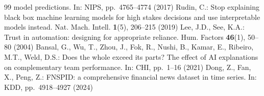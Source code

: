 \documentclass[runningheads]{llncs}
\begin{document}
\begin{thebibliography}{99}
model predictions. In: NIPS, pp.\ 4765--4774 (2017)
 Rudin, C.: Stop explaining black box machine learning models for
high stakes decisions and use interpretable models instead. Nat. Mach. Intell.
\textbf{1}(5), 206--215 (2019)
 Lee, J.D., See, K.A.: Trust in automation: designing for appropriate
reliance. Hum. Factors \textbf{46}(1), 50--80 (2004)
 Bansal, G., Wu, T., Zhou, J., Fok, R., Nushi, B., Kamar, E.,
Ribeiro, M.T., Weld, D.S.: Does the whole exceed its parts? The effect of AI explanations on
complementary team performance. In: CHI, pp.\ 1--16 (2021)
 Dong, Z., Fan, X., Peng, Z.: FNSPID: a comprehensive financial news
dataset in time series. In: KDD, pp.\ 4918--4927 (2024)
\end{thebibliography}
\end{document}
